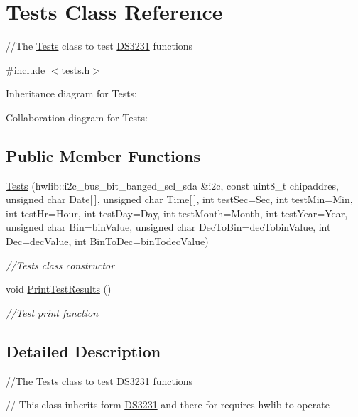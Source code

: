 \hypertarget{classTests}{}\section{Tests Class Reference}
\label{classTests}


//\+The \hyperlink{classTests}{Tests} class to test \hyperlink{classDS3231}{D\+S3231} functions  




{\ttfamily \#include $<$tests.\+h$>$}



Inheritance diagram for Tests\+:


Collaboration diagram for Tests\+:
\subsection*{Public Member Functions}
\begin{DoxyCompactItemize}
\item 
\hyperlink{classTests_afc34127a38f4366f6a014ae65e10ee57}{Tests} (hwlib\+::i2c\+\_\+bus\+\_\+bit\+\_\+banged\+\_\+scl\+\_\+sda \&i2c, const uint8\+\_\+t chipaddres, unsigned char Date\mbox{[}$\,$\mbox{]}, unsigned char Time\mbox{[}$\,$\mbox{]}, int test\+Sec=Sec, int test\+Min=Min, int test\+Hr=Hour, int test\+Day=Day, int test\+Month=Month, int test\+Year=Year, unsigned char Bin=bin\+Value, unsigned char Dec\+To\+Bin=dec\+Tobin\+Value, int Dec=dec\+Value, int Bin\+To\+Dec=bin\+Todec\+Value)
\begin{DoxyCompactList}\small\item\em //\+Tests class constructor \end{DoxyCompactList}\item 
void \hyperlink{classTests_ae29be1edf96424ad0f81a15bbf5b983e}{Print\+Test\+Results} ()
\begin{DoxyCompactList}\small\item\em //\+Test print function \end{DoxyCompactList}\end{DoxyCompactItemize}


\subsection{Detailed Description}
//\+The \hyperlink{classTests}{Tests} class to test \hyperlink{classDS3231}{D\+S3231} functions 

// This class inherits form \hyperlink{classDS3231}{D\+S3231} and there for requires hwlib to operate 

